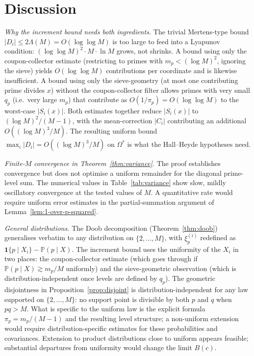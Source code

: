 \documentclass[11pt]{article}
\theoremstyle{remark}
\newcommand{\PP}{\mathbb{P}}
\newcommand{\one}{\mathbf{1}}
\begin{document}
\section{Discussion}\label{sec:discussion}

\emph{Why the increment bound needs both ingredients.} The trivial Mertens-type bound $|D_i| \leq 2 \Lambda(M) = O(\log \log M)$ is too large to feed into a Lyapunov condition: $(\log \log M)^2 \cdot M \cdot \ln M$ grows, not shrinks. A bound using only the coupon-collector estimate (restricting to primes with $m_p < (\log M)^2$, ignoring the sieve) yields $O(\log \log M)$ contributions per coordinate and is likewise insufficient. A bound using only the sieve-geometry (at most one contributing prime divides $x$) without the coupon-collector filter allows primes with very small $q_p$ (i.e.\ very large $m_p$) that contribute as $O(1/\pi_p) = O(\log \log M)$ to the worst-case $|S_i(x)|$. Both estimates together reduce $|S_i(x)|$ to $(\log M)^2/(M-1)$, with the mean-correction $|C_i|$ contributing an additional $O((\log M)^3/M)$. The resulting uniform bound $\max_i |D_i| = O((\log M)^3/M)$ on $\Omega^*$ is what the Hall--Heyde hypotheses need.

\emph{Finite-$M$ convergence in Theorem~\ref{thm:variance}.} The proof establishes convergence but does not optimise a uniform remainder for the diagonal prime-level sum. The numerical values in Table~\ref{tab:variance} show slow, mildly oscillatory convergence at the tested values of $M$. A quantitative rate would require uniform error estimates in the partial-summation argument of Lemma~\ref{lem:1-over-p-squared}.

\emph{General distributions.} The Doob decomposition (Theorem~\ref{thm:doob}) generalises verbatim to any distribution on $\{2, \ldots, M\}$, with $\xi_p^{(i)}$ redefined as $\one\{p \mid X_i\} - \PP(p \mid X)$. The increment bound uses the uniformity of the $X_i$ in two places: the coupon-collector estimate (which goes through if $\PP(p \mid X) \gtrsim m_p/M$ uniformly) and the sieve-geometric observation (which is distribution-independent once levels are defined by $q_p$). The geometric disjointness in Proposition~\ref{prop:disjoint} is distribution-independent for any law supported on $\{2,\ldots,M\}$: no support point is divisible by both $p$ and $q$ when $pq>M$. What is specific to the uniform law is the explicit formula $\pi_p=m_p/(M-1)$ and the resulting level structure; a non-uniform extension would require distribution-specific estimates for these probabilities and covariances. Extension to product distributions close to uniform appears feasible; substantial departures from uniformity would change the limit $B(c)$.
\end{document}
